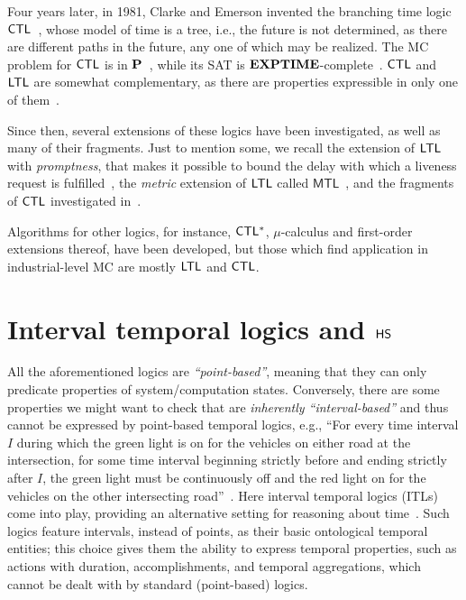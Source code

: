 Four years later, in 1981, Clarke and Emerson invented the branching time logic $\text{\sffamily CTL}$~\cite{CE81}, whose model of time is a tree, i.e., the future is not determined, as there are different paths in the future, any one of which may be realized. 
The MC problem for $\text{\sffamily CTL}$ is in $\textbf{P}$~\cite{Clarke:1986}, while its SAT is $\textbf{EXPTIME}$-complete~\cite{FL79}.
$\text{\sffamily CTL}$ and $\text{\sffamily LTL}$ are somewhat complementary, as there are properties expressible in only one of them~\cite{EH86}. 

Since then, several extensions of these logics have been investigated, as well as many of their fragments. Just to mention some,
we recall the extension of $\text{\sffamily LTL}$ with 
\emph{promptness}, that makes it 
possible to bound the delay with which a liveness request is fulfilled~\cite{DBLP:journals/fmsd/KupfermanPV09}, the \emph{metric} extension of $\text{\sffamily LTL}$ called $\mathsf{MTL}$~\cite{Ouaknine08}, and
the fragments of $\text{\sffamily CTL}$ investigated in~\cite{MEIER2008201}.

Algorithms for other logics, for instance, $\text{\sffamily CTL$^{*}$}$, $\mu$-calculus and first-order extensions thereof, have been developed, but those which find application in industrial-level MC are mostly $\text{\sffamily LTL}$ and $\text{\sffamily CTL}$.

\section{Interval temporal logics and $\text{\sffamily HS}$}

All the aforementioned logics are \emph{``point-based''}, meaning that they can only predicate properties of system/computation states.
Conversely,
there are some properties we might want to check that are \emph{inherently ``interval-based''} and thus cannot be expressed by point-based temporal logics, e.g., 
``For every time interval $I$ during which the green light is on for the vehicles on either road at the intersection, 
for some time interval beginning strictly before and ending strictly after $I$,
 the green
light must be continuously off and the red light on
for the vehicles on the other intersecting road''~\cite{DBLP:journals/eatcs/MonicaGMS11}.
Here interval temporal logics (ITLs) come into play, providing an alternative setting for 
reasoning about time~\cite{HS91,chopping_intervals,venema1990}. Such logics feature intervals, instead of points, as their basic ontological temporal entities; this choice gives them the ability to 
express temporal properties, such as actions with duration, accomplishments, and temporal aggregations, which cannot be dealt with by standard (point-based) logics.

